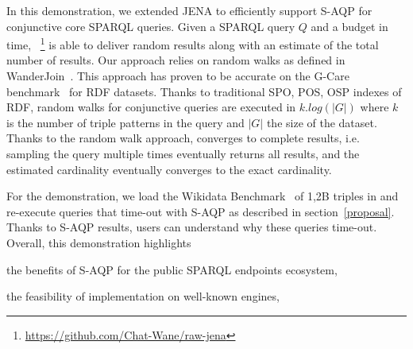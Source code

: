   In this demonstration, we extended JENA to efficiently support
  S-AQP for conjunctive core
  SPARQL queries. Given a SPARQL query $Q$ and a budget in time,
  \NAME~\footnote{\url{https://github.com/Chat-Wane/raw-jena}} is able
  to deliver random results along with an estimate of the
  total number of results. Our approach relies on random
 walks as defined in WanderJoin~\cite{li2016wanderjoin}. This approach
 has proven to be accurate on the G-Care
 benchmark~\cite{DBLP:conf/sigmod/ParkKBKHH20} for RDF datasets. Thanks
 to traditional SPO, POS, OSP indexes of RDF, random
 walks for conjunctive queries are executed in $k.log(|G|)$ where
 $k$ is the number of triple patterns in the query and $|G|$ the size
 of the dataset. Thanks to the random walk approach, \NAME converges
 to complete results, i.e. sampling the query multiple times eventually
 returns all results, and the estimated cardinality eventually converges
 to the exact cardinality.

 \noindent For the demonstration, we load the Wikidata
 Benchmark~\cite{angles2022wdbench} of 1,2B triples in \NAME and
 re-execute queries that time-out with S-AQP as described in
 section~\ref{proposal}. Thanks to S-AQP results, users can understand
 why these queries time-out. Overall, this demonstration highlights
\begin{inparaenum}[(i)]
\item the benefits of S-AQP for the public SPARQL endpoints ecosystem,
\item the feasibility of implementation on well-known engines,
\end{inparaenum}


